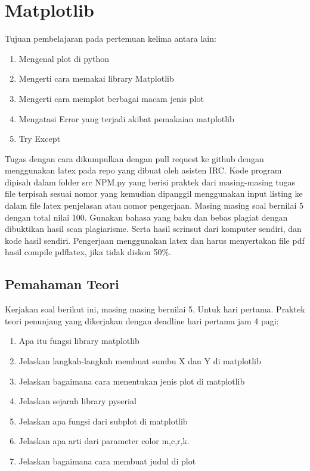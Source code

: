 \chapter{Matplotlib}

Tujuan pembelajaran pada pertemuan kelima antara lain:
\begin{enumerate}
\item
Mengenal plot di python
\item
Mengerti cara memakai library Matplotlib
\item
Mengerti cara memplot berbagai macam jenis plot
\item
Mengatasi Error yang terjadi akibat pemakaian matplotlib
\item
Try Except
\end{enumerate}
Tugas dengan cara dikumpulkan dengan pull request ke github dengan menggunakan latex pada repo yang dibuat oleh asisten IRC. Kode program dipisah dalam folder src NPM.py yang berisi praktek dari masing-masing tugas file terpisah sesuai nomor yang kemudian dipanggil menggunakan input listing ke dalam file latex penjelasan atau nomor pengerjaan. Masing masing soal bernilai 5 dengan total nilai 100. Gunakan bahasa yang baku dan bebas plagiat dengan dibuktikan hasil scan plagiarisme. Serta hasil scrinsut dari komputer sendiri, dan kode hasil sendiri. Pengerjaan menggunakan latex dan harus menyertakan file pdf hasil compile pdflatex, jika tidak diskon 50\%.


\section{Pemahaman Teori}
Kerjakan soal berikut ini, masing masing bernilai 5. Untuk hari pertama.
Praktek teori penunjang yang dikerjakan dengan deadline hari pertama jam 4 pagi:
\begin{enumerate}
\item
Apa itu fungsi library matplotlib
\item
Jelaskan langkah-langkah membuat sumbu X dan Y di matplotlib
\item
Jelaskan bagaimana cara menentukan jenis plot di matplotlib
\item
Jelaskan sejarah library pyserial
\item
Jelaskan apa fungsi dari subplot di matplotlib
\item
Jelaskan apa arti dari parameter color m,c,r,k.
\item
Jelaskan bagaimana cara membuat judul di plot
\end{enumerate}

